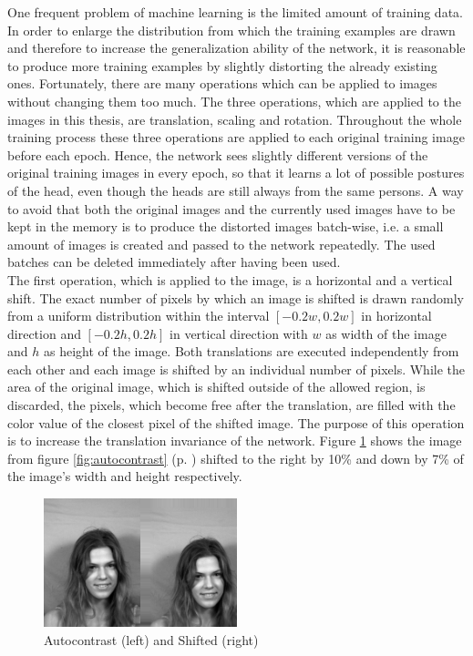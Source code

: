 \documentclass[11pt, a4paper]{article}
\newcommand\myref[1]{\ref{#1} (p. \pageref{#1})}
\begin{document}
One frequent problem of machine learning is the limited amount of training data. In order to enlarge the distribution from which the training examples are drawn and therefore to increase the generalization ability of the network, it is reasonable to produce more training examples by slightly distorting the already existing ones. Fortunately, there are many operations which can be applied to images without changing them too much. The three operations, which are applied to the images in this thesis, are translation, scaling and rotation. Throughout the whole training process these three operations are applied to each original training image before each epoch. Hence, the network sees slightly different versions of the original training images in every epoch, so that it learns a lot of possible postures of the head, even though the heads are still always from the same persons. A way to avoid that both the original images and the currently used images have to be kept in the memory is to produce the distorted images batch-wise, i.e. a small amount of images is created and passed to the network repeatedly. The used batches can be deleted immediately after having been used.\\
The first operation, which is applied to the image, is a horizontal and a vertical shift. The exact number of pixels by which an image is shifted is drawn randomly from a uniform distribution within the interval $[-0.2w, 0.2w]$ in horizontal direction and $[-0.2h, 0.2h]$ in vertical direction with $w$ as width of the image and $h$ as height of the image. Both translations are executed independently from each other and each image is shifted by an individual number of pixels. While the area of the original image, which is shifted outside of the allowed region, is discarded, the pixels, which become free after the translation, are filled with the color value of the closest pixel of the shifted image. The purpose of this operation is to increase the translation invariance of the network. Figure \ref{fig:autocontrast_shifted} shows the image from figure \myref{fig:autocontrast} shifted to the right by 10\% and down by 7\% of the image's width and height respectively.

\begin{figure}[htbp]
	\centering
	\includegraphics[width=0.5\textwidth]{autcontrast_shifted.png}
	\caption{Autocontrast (left) and Shifted (right)}
	\label{fig:autocontrast_shifted}
\end{figure}
\end{document}
